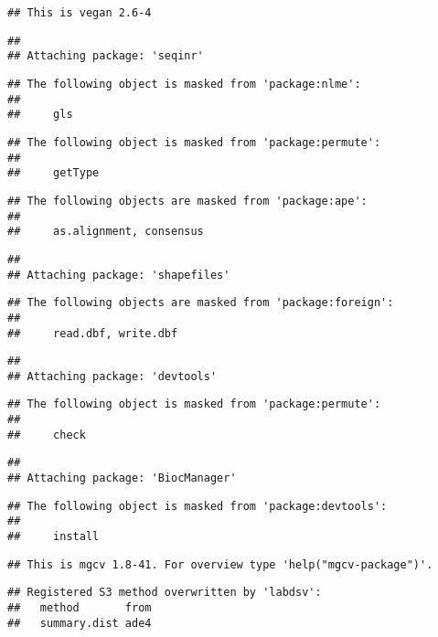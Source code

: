 \documentclass[
]{article}
\begin{document}
\begin{verbatim}
## This is vegan 2.6-4
\end{verbatim}

\begin{verbatim}
## 
## Attaching package: 'seqinr'
\end{verbatim}

\begin{verbatim}
## The following object is masked from 'package:nlme':
## 
##     gls
\end{verbatim}

\begin{verbatim}
## The following object is masked from 'package:permute':
## 
##     getType
\end{verbatim}

\begin{verbatim}
## The following objects are masked from 'package:ape':
## 
##     as.alignment, consensus
\end{verbatim}

\begin{verbatim}
## 
## Attaching package: 'shapefiles'
\end{verbatim}

\begin{verbatim}
## The following objects are masked from 'package:foreign':
## 
##     read.dbf, write.dbf
\end{verbatim}

\begin{verbatim}
## 
## Attaching package: 'devtools'
\end{verbatim}

\begin{verbatim}
## The following object is masked from 'package:permute':
## 
##     check
\end{verbatim}

\begin{verbatim}
## 
## Attaching package: 'BiocManager'
\end{verbatim}

\begin{verbatim}
## The following object is masked from 'package:devtools':
## 
##     install
\end{verbatim}

\begin{verbatim}
## This is mgcv 1.8-41. For overview type 'help("mgcv-package")'.
\end{verbatim}

\begin{verbatim}
## Registered S3 method overwritten by 'labdsv':
##   method       from
##   summary.dist ade4
\end{verbatim}
\end{document}
